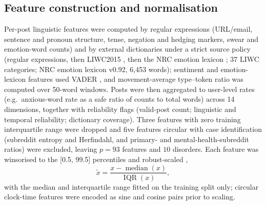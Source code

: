 \documentclass[11pt]{article}
\begin{document}
\subsection*{Feature construction and normalisation}
Per-post linguistic features were computed by regular expressions (URL/email, sentence and
pronoun structure, tense, negation and hedging markers, swear and emotion-word counts) and by
external dictionaries under a strict source policy (regular expressions, then LIWC2015 \cite{pennebaker2015liwc}, then the NRC emotion lexicon \cite{mohammad2013nrc}; 37 LIWC
categories; NRC emotion lexicon v0.92, 6{,}453 words); sentiment and emotion-lexicon features
used VADER \cite{hutto2014vader}, and movement-average type--token ratio was computed over
50-word windows. Posts were then aggregated to user-level rates (e.g.\ anxious-word rate as a
safe ratio of counts to total words) across 14 dimensions, together with reliability flags
(valid-post count; linguistic and temporal reliability; dictionary coverage). Three features
with zero training interquartile range were dropped and five features circular with case
identification (subreddit entropy and Herfindahl, and primary- and mental-health-subreddit
ratios) were excluded, leaving $p=93$ features and $10$ disorders. Each feature was winsorised
to the [0.5, 99.5] percentiles and robust-scaled \cite{pedregosa2011scikit},
\begin{equation}
\tilde{x}=\frac{x-\operatorname{median}(x)}{\operatorname{IQR}(x)},
\label{eq:robust}
\end{equation}
with the median and interquartile range fitted on the training split only; circular clock-time
features were encoded as sine and cosine pairs prior to scaling.
\end{document}
